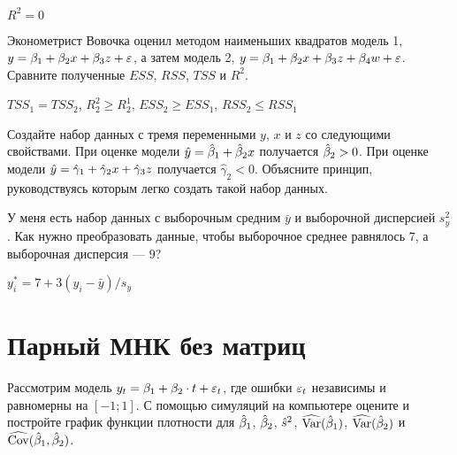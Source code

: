 \documentclass[pdftex,11pt,openany]{book}\usepackage[]{graphicx}\usepackage[]{color}
\begin{document}
\begin{solution}
$R^2=0$
\end{solution}



\begin{problem}
 Эконометрист Вовочка оценил методом наименьших квадратов модель 1, $y=\beta_1+\beta_2 x+\beta_3 z+\varepsilon$, а затем модель 2, $y=\beta_1+\beta_2 x+\beta_3 z+\beta_4 w+\varepsilon$. Сравните полученные $ESS$, $RSS$, $TSS$ и $R^2$.
\end{problem}

\begin{solution}
 $TSS_1=TSS_2$, $R_2^2\geq R_2^1$, $ESS_2\geq ESS_1$, $RSS_2\leq RSS_1$
\end{solution}




\begin{problem}
  Создайте набор данных с тремя переменными $y$, $x$ и $z$ со следующими свойствами. При оценке модели $\hat{y}=\hat{\beta}_1+\hat{\beta}_2 x$ получается $\hat{\beta}_2>0$. При оценке модели $\hat{y}=\hat{\gamma}_1+ \hat{\gamma}_2 x+\hat{\gamma}_3 z$ получается $\hat{\gamma}_2<0$. Объясните принцип, руководствуясь которым легко создать такой набор данных.
\end{problem}

\begin{solution}
\end{solution}


\begin{problem}
 У меня есть набор данных с выборочным средним $\bar{y}$ и выборочной дисперсией $s_y^2$. Как нужно преобразовать данные, чтобы выборочное среднее равнялось $7$, а выборочная дисперсия --- $9$? 
\end{problem}

\begin{solution}
 $y_i^*=7+3(y_i-\bar{y})/s_y$ 
\end{solution}



\chapter{Парный МНК без матриц}


\begin{problem}
 Рассмотрим модель $y_t=\beta_1+\beta_2 \cdot t + \varepsilon_t$, где ошибки $\varepsilon_t$ независимы и равномерны на $[-1;1]$. С помощью симуляций на компьютере оцените и постройте график функции плотности для $\hat{\beta}_1$, $\hat{\beta}_2$, $\hat{s}^2$, $\widehat{\operatorname{Var}}(\hat{\beta}_1)$, $\widehat{\operatorname{Var}}(\hat{\beta}_2)$ и $\widehat{\operatorname{Cov}}(\hat{\beta}_1,\hat{\beta}_2)$. 
\end{problem}
 
\end{document}
